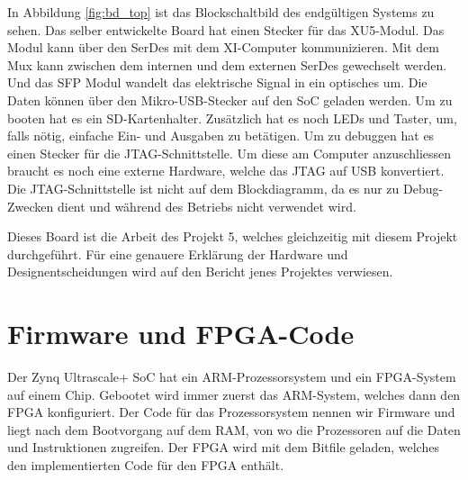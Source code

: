 \documentclass{article}
\begin{document}
In Abbildung \ref{fig:bd_top} ist das Blockschaltbild des endgültigen Systems zu sehen. Das selber entwickelte Board hat einen Stecker für das XU5-Modul. Das Modul kann über den SerDes mit dem XI-Computer kommunizieren. Mit dem Mux kann zwischen dem internen und dem externen SerDes gewechselt werden. Und das SFP Modul wandelt das elektrische Signal in ein optisches um. Die Daten können über den Mikro-USB-Stecker auf den SoC geladen werden. Um zu booten hat es ein SD-Kartenhalter. Zusätzlich hat es noch LEDs und Taster, um, falls nötig, einfache Ein- und Ausgaben zu betätigen. Um zu debuggen hat es einen Stecker für die JTAG-Schnittstelle. Um diese am Computer anzuschliessen braucht es noch eine externe Hardware, welche das JTAG auf USB konvertiert. Die JTAG-Schnittstelle ist nicht auf dem Blockdiagramm, da es nur zu Debug-Zwecken dient und während des Betriebs nicht verwendet wird. 

Dieses Board ist die Arbeit des Projekt 5, welches gleichzeitig mit diesem Projekt durchgeführt. Für eine genauere Erklärung der Hardware und Designentscheidungen wird auf den Bericht jenes Projektes verwiesen. 

\clearpage
\section{Firmware und FPGA-Code}

Der Zynq Ultrascale+ SoC hat ein ARM-Prozessorsystem und ein FPGA-System auf einem Chip. Gebootet wird immer zuerst das ARM-System, welches dann den FPGA konfiguriert. Der Code für das Prozessorsystem nennen wir Firmware und liegt nach dem Bootvorgang auf dem RAM, von wo die Prozessoren auf die Daten und Instruktionen zugreifen. Der FPGA wird mit dem Bitfile geladen, welches den implementierten Code für den FPGA enthält. 
\end{document}
